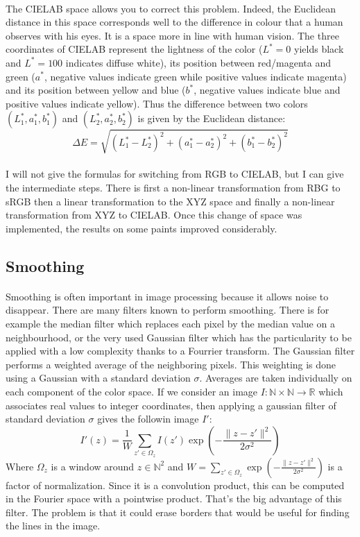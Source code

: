 \documentclass[10pt]{article}
\newcommand{\N}{\mathbb{N}}
\newcommand{\R}{\mathbb{R}}
\begin{document}
	\paragraph{}
	The CIELAB space \cite{cielab} allows you to correct this problem. Indeed, the Euclidean distance in this space corresponds well to the difference in colour that a human observes with his eyes. It is a space more in line with human vision. The three coordinates of CIELAB represent the lightness of the color ($L^* = 0$ yields black and $L^* = 100$ indicates diffuse white), its position between red/magenta and green ($a^*$, negative values indicate green while positive values indicate magenta) and its position between yellow and blue ($b^*$, negative values indicate blue and positive values indicate yellow). Thus the difference between two colors $(L_1^*, a_1^*, b_1^*)$ and $(L_2^*, a_2^*, b_2^*)$ is given by the Euclidean distance:
	$$ \Delta E = \sqrt{(L_1^* - L_2^*)^2 + (a_1^* - a_2^*)^2 + (b_1^* - b_2^*)^2} $$
	
	\paragraph{}
	I will not give the formulas for switching from RGB to CIELAB, but I can give the intermediate steps. There is first a non-linear transformation from RBG to sRGB then a linear transformation to the XYZ space and finally a non-linear transformation from XYZ to CIELAB. Once this change of space was implemented, the results on some paints improved considerably.
	
	\subsection{Smoothing}
	
	\paragraph{}
	Smoothing is often important in image processing because it allows noise to disappear. There are many filters known to perform smoothing. There is for example the median filter which replaces each pixel by the median value on a neighbourhood, or the very used Gaussian filter which has the particularity to be applied with a low complexity thanks to a Fourrier transform. The Gaussian filter performs a weighted average of the neighboring pixels. This weighting is done using a Gaussian with a standard deviation $\sigma$. Averages are taken individually on each component of the color space. If we consider an image $I : \N \times \N \rightarrow \R$ which associates real values to integer coordinates, then applying a gaussian filter of standard deviation $\sigma$ gives the followin image $I'$:
	$$ I'(z) = \dfrac{1}{W} \sum_{z' \in \Omega_{z}} I(z') \exp \left( - \dfrac{\| z - z'\|^2}{2 \sigma^2} \right) $$
	Where $\Omega_{z}$ is a window around $z \in \N^2$ and $W = \sum_{z' \in \Omega_{z}} \exp \left( - \frac{\| z - z'\|^2}{2 \sigma^2} \right)$ is a factor of normalization. Since it is a convolution product, this can be computed in the Fourier space with a pointwise product. That's the big advantage of this filter. The problem is that it could erase borders that would be useful for finding the lines in the image.
	
\end{document}
